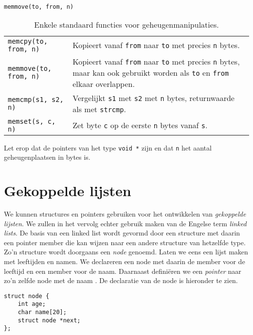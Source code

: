 \hbox{\texttt{memmove(to, from, n)}}
\begin{table}[!ht]
\centering
\caption{Enkele standaard functies voor geheugenmanipulaties.}
\label{tab:arymemmanip}
\begin{tabular}{@{}p{}p{10cm}@{}}
\toprule
\texttt{memcpy(to, from, n)} &  Kopieert vanaf \texttt{from} naar \texttt{to} met precies \texttt{n} bytes.\\
\texttt{memmove(to, from, n)} &  Kopieert vanaf \texttt{from} naar \texttt{to} met precies \texttt{n} bytes, maar kan ook gebruikt worden als \texttt{to} en \texttt{from} elkaar overlappen.\\
\texttt{memcmp(s1, s2, n)} &  Vergelijkt \texttt{s1} met \texttt{s2} met \texttt{n} bytes, returnwaarde als met \texttt{strcmp}.\\
\texttt{memset(s, c, n)} & Zet byte \texttt{c} op de eerste \texttt{n} bytes vanaf \texttt{s}.\\
\bottomrule
\end{tabular} 
\end{table}

Let erop dat de pointers van het type \texttt{void *} zijn en dat \texttt{n} het aantal geheugenplaatsen in bytes is.


\advanced
\section{Gekoppelde lijsten}
We kunnen structures en pointers gebruiken voor het ontwikkelen van \textsl{gekoppelde lijsten}. We zullen in het vervolg echter gebruik maken van de Engelse term \textsl{linked lists}. De basis van een linked list wordt gevormd door een structure met daarin een pointer member die kan wijzen naar een andere structure van hetzelfde type. Zo'n structure wordt doorgaans een \textsl{node} genoemd. Laten we eens een lijst maken met leeftijden en namen. We declareren een node met daarin de member  voor de leeftijd en een member  voor de naam. Daarnaast definiëren we een \textsl{pointer} naar zo'n zelfde node met de naam . De declaratie van de node is hieronder te zien.

\begin{lstlisting}[style=lstoneline]
struct node {
	int age;
	char name[20];
	struct node *next;
};
\end{lstlisting}

